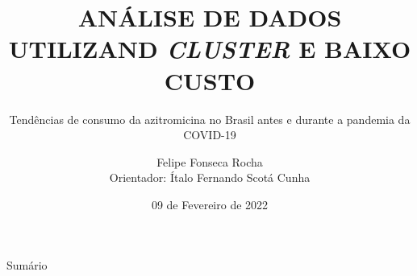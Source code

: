 \documentclass[10pt,brazil]{beamer}
\theoremstyle{definition}
\begin{document}

\title[]{ANÁLISE DE DADOS UTILIZAND \emph{CLUSTER} E BAIXO CUSTO}
\subtitle{Tendências de consumo da
azitromicina no Brasil antes e durante a
pandemia da COVID-19}


\author[Felipe Rocha]{Felipe Fonseca Rocha \\
  \vspace{0.25cm}
  Orientador: Ítalo Fernando Scotá Cunha}
\date{09 de Fevereiro de 2022}

\AtBeginSubsection{%
  \begin{frame}
    \tableofcontents[currentsection,sectionstyle=show/shaded,subsectionstyle=show/hide/hide]
  \end{frame}
}
\frame{\maketitle}


\begin{frame}{Sumário}
  \tableofcontents[hideallsubsections]
\end{frame}


%
%

\end{document}
